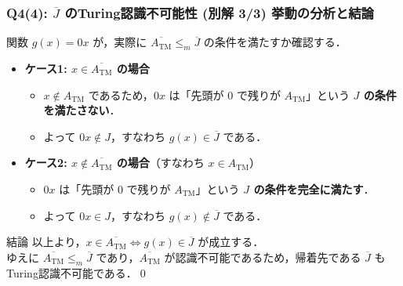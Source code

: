 \begin{frame}[fragile]
\frametitle{Q4(4): $\overline{J}$ のTuring認識不可能性 (別解 3/3) 挙動の分析と結論}
関数 $g(x) = 0x$ が，実際に $\overline{A_{\mathrm{TM}}} \le_m \overline{J}$ の条件を満たすか確認する．

\begin{itemize}
  \item \textbf{ケース1: $x \in \overline{A_{\mathrm{TM}}}$ の場合}
  \begin{itemize}
      \item $x \notin A_{\mathrm{TM}}$ であるため，$0x$ は「先頭が $0$ で残りが $A_{\mathrm{TM}}$」という \textbf{$J$ の条件を満たさない}．
      \item よって $0x \notin J$，すなわち \alert{$g(x) \in \overline{J}$} である．
  \end{itemize}
  \vspace{0.5em}
  \item \textbf{ケース2: $x \notin \overline{A_{\mathrm{TM}}}$ の場合}（すなわち $x \in A_{\mathrm{TM}}$）
  \begin{itemize}
      \item $0x$ は「先頭が $0$ で残りが $A_{\mathrm{TM}}$」という \textbf{$J$ の条件を完全に満たす}．
      \item よって $0x \in J$，すなわち \textbf{$g(x) \notin \overline{J}$} である．
  \end{itemize}
\end{itemize}

\vspace{0.5em}
\begin{block}{結論}
  以上より，$x \in \overline{A_{\mathrm{TM}}} \iff g(x) \in \overline{J}$ が成立する．\\
  ゆえに $\overline{A_{\mathrm{TM}}} \le_m \overline{J}$ であり，$\overline{A_{\mathrm{TM}}}$ が認識不可能であるため，帰着先である \alert{$\overline{J}$ もTuring認識不可能}である．\qed
\end{block}
\end{frame}

